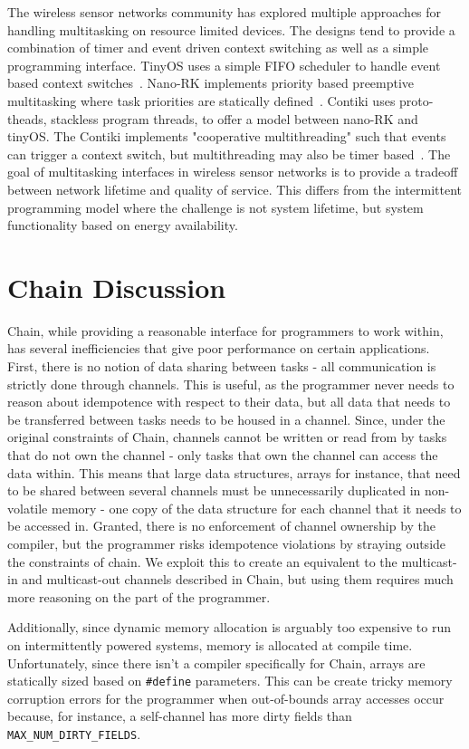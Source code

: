 \documentclass[11pt]{sensys-proc}
\newcommand{\chain}{Chain\xspace}
\begin{document}
The wireless sensor networks community has explored multiple approaches for handling
multitasking on resource limited devices. The designs tend to provide a combination of
timer and event driven context switching as well as a simple programming interface.
TinyOS uses a simple FIFO scheduler to handle event based context switches~\cite{tiny}.
Nano-RK implements priority based preemptive multitasking where task priorities are
statically defined~\cite{nano}. Contiki uses proto-theads, stackless program threads, to
offer a model between nano-RK and tinyOS. The Contiki implements "cooperative
multithreading" such that events can trigger a context switch, but multithreading may also
be timer based~\cite{contiki}. The goal of multitasking interfaces in wireless sensor
networks is to provide a tradeoff between network lifetime and quality of service. This
differs from the intermittent programming model where the challenge is not system
lifetime, but system functionality based on energy availability. 

\section{Chain Discussion}
\chain, while providing a reasonable interface for programmers to work within,
has several inefficiencies that give poor performance on certain applications.
First, there is no notion of data sharing between tasks - all communication is
strictly done through channels. This is useful, as the programmer never needs
to reason about idempotence with respect to their data, but all data that needs
to be transferred between tasks needs to be housed in a channel. Since, under
the original constraints of \chain, channels cannot be written or read from by
tasks that do not own the channel - only tasks that own the channel can access
the data within. This means that large data structures, arrays for instance,
that need to be shared between several channels must be unnecessarily
duplicated in non-volatile memory - one copy of the data structure for each
channel that it needs to be accessed in. Granted, there is no enforcement of
channel ownership by the compiler, but the programmer risks idempotence
violations by straying outside the constraints of chain. We exploit this to
create an equivalent to the multicast-in and multicast-out channels described
in \chain, but using them requires much more reasoning on the part of the programmer.


Additionally, since dynamic memory allocation is arguably too expensive to run
on intermittently powered systems, memory is allocated at compile time.
Unfortunately, since there isn't a compiler specifically for \chain, arrays
are statically sized based on \texttt{\#define} parameters. This can be
create tricky memory corruption errors for the programmer when out-of-bounds
array accesses occur because, for instance, a self-channel has more dirty
fields than \texttt{MAX\_NUM\_DIRTY\_FIELDS}.
\end{document}

